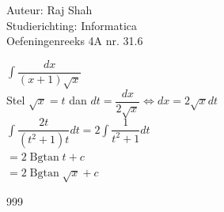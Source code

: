 \documentclass[a4paper]{article}
\begin{document}
  
\noindent \large Auteur: Raj Shah \\
\noindent \large Studierichting: Informatica\\
\noindent \large Oefeningenreeks 4A nr. 31.6\\

\medskip

\normalsize

$\displaystyle\int \dfrac{dx}{(x+1)\sqrt{x}}$\\

Stel $\sqrt{x} = t$ dan $dt = \dfrac{dx}{2 \sqrt{x}} \Leftrightarrow dx = 2\sqrt{x} dt$\\ 

$\displaystyle\int \dfrac{2t}{\left(t^2 + 1\right) t} dt = 2 \displaystyle\int \dfrac{1}{t^2 + 1}dt$\\

$ = 2 \operatorname{Bgtan} t + c$\\

$ = 2 \operatorname{Bgtan} \sqrt{x} + c$\\







\begin{thebibliography}{999}
\end{thebibliography}
\end{document}
